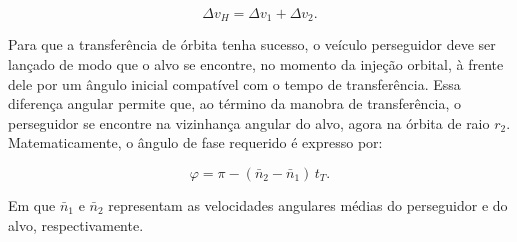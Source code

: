 \begin{equation}
\Delta v_{H} = \Delta v_1 + \Delta v_2.
\end{equation}

Para que a transferência de órbita tenha sucesso, o veículo perseguidor deve ser lançado de modo que o alvo se encontre, no momento da injeção orbital, à frente dele por um ângulo inicial compatível com o tempo de transferência.
Essa diferença angular permite que, ao término da manobra de transferência, o perseguidor se encontre na vizinhança angular do alvo, agora na órbita de raio $r_2$.
Matematicamente, o ângulo de fase requerido é expresso por:


\begin{equation}
\varphi = \pi - \left(\bar{n}_2 - \bar{n}_1\right)\,t_T.
\end{equation}

Em que $\bar{n}_1$ e $\bar{n}_2$ representam as velocidades angulares médias do perseguidor e do alvo, respectivamente.